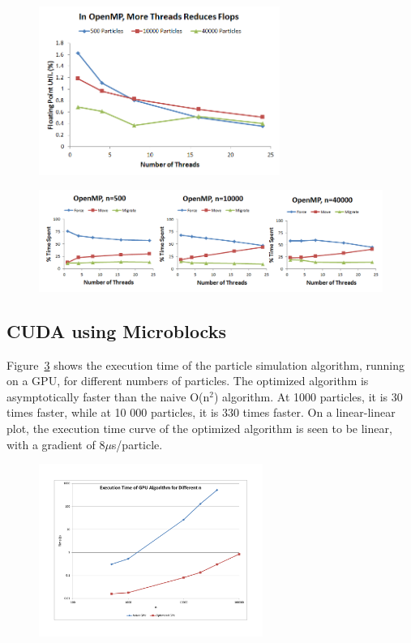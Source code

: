 \documentclass[11pt]{article} %
\begin{document}
\begin{figure}[!h]
\centering
\includegraphics[width=0.7\textwidth]{figures/openmp_mb_flops.png}
\caption{}
\label{openmp_mb_flops}
\end{figure}

\begin{figure}[!h]
\centering
\includegraphics[width=1\textwidth]{figures/openmp_mb_rtime.png}
\caption{}
\label{openmp_mb_rtime}
\end{figure}

\subsection{CUDA using Microblocks}

Figure~\ref{gpu_time_vs_n} shows the execution time of the particle simulation algorithm, running on a GPU, for different numbers of particles. The optimized algorithm is asymptotically faster than the naive O(n$^2$) algorithm. At 1000 particles, it is 30 times faster, while at 10 000 particles, it is 330 times faster. On a linear-linear plot, the execution time curve of the optimized algorithm is seen to be linear, with a gradient of 8$\mu$s/particle.

\begin{figure}[!h]
\centering
\includegraphics*[width=0.65\textwidth, viewport= 70 70 730 550]{figures/gpu_time_vs_n}
\caption{}
\label{gpu_time_vs_n}
\end{figure}
\end{document}
